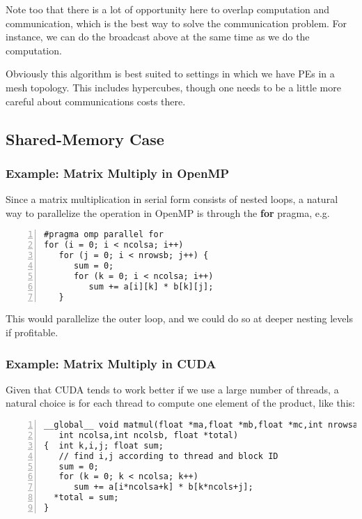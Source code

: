 Note too that there is a lot of opportunity here to overlap computation
and communication, which is the best way to solve the communication
problem.  For instance, we can do the broadcast above at the same time
as we do the computation.

Obviously this algorithm is best suited to settings in which we have PEs
in a mesh topology.  This includes hypercubes, though one needs to be a
little more careful about communications costs there.

\subsection{Shared-Memory Case}

\subsubsection{Example:  Matrix Multiply in OpenMP}
\label{openmpmatmul}

Since a matrix multiplication in serial form consists of nested loops, a
natural way to parallelize the operation in OpenMP is through the {\bf
for} pragma, e.g.

\begin{lstlisting}[numbers=left]
#pragma omp parallel for
for (i = 0; i < ncolsa; i++)
   for (j = 0; i < nrowsb; j++) {
      sum = 0;
      for (k = 0; i < ncolsa; i++)
         sum += a[i][k] * b[k][j];
   }
\end{lstlisting}

This would parallelize the outer loop, and we could do so at deeper
nesting levels if profitable.

\subsubsection{Example:  Matrix Multiply in CUDA}
\label{cudamatmult}

Given that CUDA tends to work better if we use a large number of
threads, a natural choice is for each thread to compute one element of
the product, like this:

\begin{lstlisting}[numbers=left]
__global__ void matmul(float *ma,float *mb,float *mc,int nrowsa,
   int ncolsa,int ncolsb, float *total)
{  int k,i,j; float sum;
   // find i,j according to thread and block ID
   sum = 0;
   for (k = 0; k < ncolsa; k++)
      sum += a[i*ncolsa+k] * b[k*ncols+j];
  *total = sum;
}
\end{lstlisting}

